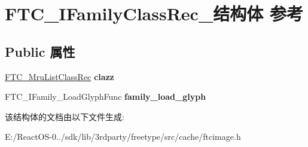 \hypertarget{struct_f_t_c___i_family_class_rec__}{}\section{F\+T\+C\+\_\+\+I\+Family\+Class\+Rec\+\_\+结构体 参考}
\label{struct_f_t_c___i_family_class_rec__}
\subsection*{Public 属性}
\begin{DoxyCompactItemize}
\item 
\mbox{\label{struct_f_t_c___i_family_class_rec___a2490821b484afe33829ba3a302593760}} 
\hyperlink{struct_f_t_c___mru_list_class_rec__}{F\+T\+C\+\_\+\+Mru\+List\+Class\+Rec} {\bfseries clazz}
\item 
\mbox{\label{struct_f_t_c___i_family_class_rec___a32eae98a413c990fe0f4b83906b3cbb8}} 
F\+T\+C\+\_\+\+I\+Family\+\_\+\+Load\+Glyph\+Func {\bfseries family\+\_\+load\+\_\+glyph}
\end{DoxyCompactItemize}


该结构体的文档由以下文件生成\+:\begin{DoxyCompactItemize}
\item 
E\+:/\+React\+O\+S-\/0../sdk/lib/3rdparty/freetype/src/cache/ftcimage.\+h\end{DoxyCompactItemize}
